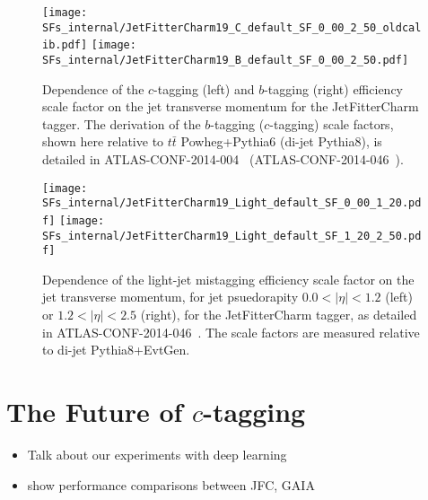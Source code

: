 \newcommand{\lSF}{as detailed in ATLAS-CONF-2014-046~\cite{bc2014}. The scale factors are measured relative to di-jet Pythia8+EvtGen.} %
\newcommand{\cSF}{as detailed in ATLAS-CONF-2014-046~\cite{bc2014}. The scale factors are measured relative to di-jet Pythia8.} %
\newcommand{\bSF}{as detailed in ATLAS-CONF-2014-004~\cite{Giacinto}. The scale factors are measured relative to $t \bar{t}$ Powheg+Pythia6.} %

\begin{figure}[!h]
  \centering
  \texttt{[image: SFs\_internal/JetFitterCharm19\_C\_default\_SF\_0\_00\_2\_50\_oldcalib.pdf]}
  \texttt{[image: SFs\_internal/JetFitterCharm19\_B\_default\_SF\_0\_00\_2\_50.pdf]}
  \caption{Dependence of the $c$-tagging (left) and $b$-tagging (right) efficiency scale factor on the jet transverse momentum for the JetFitterCharm tagger. The derivation of the $b$-tagging ($c$-tagging) scale factors, shown here relative to $t \bar{t}$ Powheg+Pythia6 (di-jet Pythia8), is detailed in ATLAS-CONF-2014-004~\cite{Giacinto} (ATLAS-CONF-2014-046~\cite{bc2014}).}
  \label{tag:JFC_SF_B}
\end{figure}

\begin{figure}[!htb]
  \centering
  \texttt{[image: SFs\_internal/JetFitterCharm19\_Light\_default\_SF\_0\_00\_1\_20.pdf]}
  \texttt{[image: SFs\_internal/JetFitterCharm19\_Light\_default\_SF\_1\_20\_2\_50.pdf]}
  \caption{Dependence of the light-jet mistagging efficiency scale factor on the jet transverse momentum, for jet psuedorapity $0.0 < | \eta | < 1.2$ (left) or $1.2 < | \eta | < 2.5$ (right), for the JetFitterCharm tagger, \lSF}
  
  \label{tag:JFC_SF_L1}
\end{figure}




\section{The Future of $c$-tagging}
\begin{itemize}
\item Talk about our experiments with deep learning
\item  show performance comparisons between JFC, GAIA
\end{itemize}
